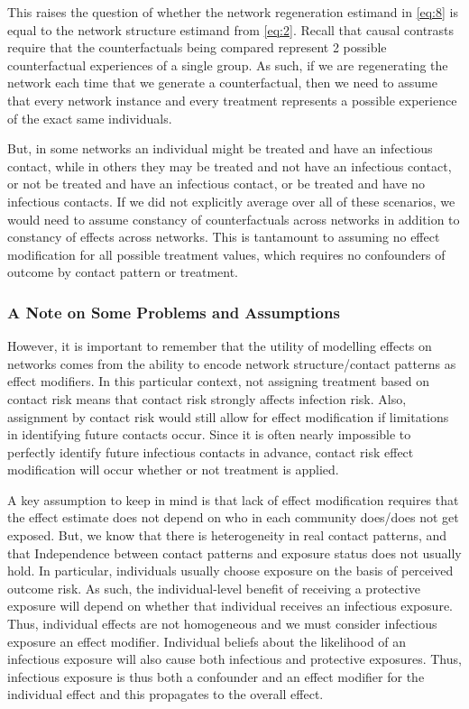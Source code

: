 \documentclass{article}
\theoremstyle{definition}
\begin{document}
This raises the question of whether the network regeneration estimand in \ref{eq:8}  is equal to the network structure estimand from \ref{eq:2}. Recall that causal contrasts require that the counterfactuals being compared represent 2 possible counterfactual experiences of a single group. As such, if we are regenerating the network each time that we generate a counterfactual, then we need to assume that every network instance and every treatment represents a possible experience of the exact same individuals. 

But, in some networks an individual might be treated and have an infectious contact, while in others they may be treated and not have an infectious contact, or not be treated and have an infectious contact, or be treated and have no infectious contacts. If we did not explicitly average over all of these scenarios, we would need to assume constancy of counterfactuals across networks in addition to constancy of effects across networks. This is tantamount to assuming no effect modification for all possible treatment values, which requires no confounders of outcome by contact pattern or treatment.
\subsubsection{A Note on Some Problems and Assumptions}

However, it is important to remember that the utility of modelling effects on networks comes from the ability to encode network structure/contact patterns as effect modifiers. In this particular context, not assigning treatment based on contact risk means that contact risk strongly affects infection risk. Also, assignment by contact risk would still allow for effect modification if limitations in identifying future contacts occur. Since it is often nearly impossible to perfectly identify future infectious contacts in advance, contact risk effect modification will occur whether or not treatment is applied.

A key assumption to keep in mind is that lack of effect modification requires that the effect estimate does not depend on who in each community does/does not get exposed. But, we know that there is heterogeneity in real contact patterns, and that Independence between contact patterns and exposure status does not usually hold. In particular, individuals usually choose exposure on the basis of perceived outcome risk. As such, the individual-level benefit of receiving a protective exposure will depend on whether that individual receives an infectious exposure. Thus, individual effects are not homogeneous and we must consider infectious exposure an effect modifier. Individual beliefs about the likelihood of an infectious exposure will also cause both infectious and protective exposures. Thus, infectious exposure is thus both a confounder and an effect modifier for the individual effect and this propagates to the overall effect. 
\end{document}
